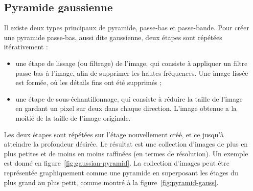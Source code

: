 \subsection{Pyramide gaussienne}

Il existe deux types principaux de pyramide, passe-bas et passe-bande. Pour créer une pyramide passe-bas, aussi dite gaussienne, deux étapes sont répétées itérativement :

\bigskip

\begin{itemize}
    \item une étape de lissage (ou filtrage) de l'image, qui consiste à appliquer un filtre passe-bas à l'image, afin de supprimer les hautes fréquences. Une image lissée est formée, où les détails fins ont été supprimés ;
    \item une étape de sous-échantillonnage, qui consiste à réduire la taille de l'image en gardant un pixel sur deux dans chaque direction. L'image obtenue a la moitié de la taille de l'image originale.
\end{itemize}

\bigskip

Les deux étapes sont répétées sur l'étage nouvellement créé, et ce jusqu'à atteindre la profondeur désirée. Le résultat est une collection d'images de plus en plus petites et de moins en moins raffinées (en termes de résolution). Un exemple est donné en figure~\ref{fig:gaussian-pyramid}. La collection d'images peut être représentée graphiquement comme une pyramide en superposant les étages du plus grand au plus petit, comme montré à la figure~\ref{fig:pyramid-gauss}.

\bigskip

